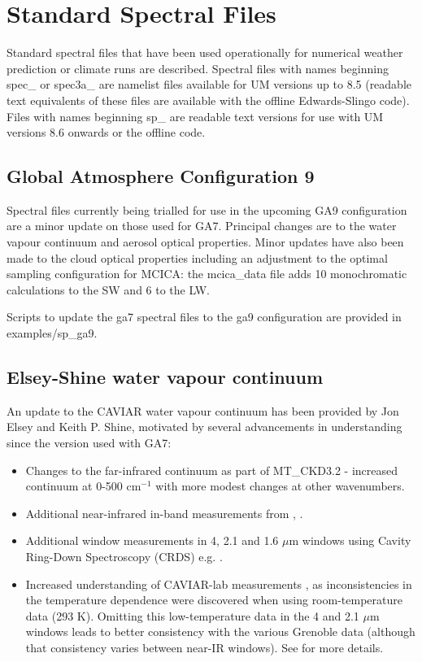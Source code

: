\section{Standard Spectral Files}

Standard spectral files that have been used operationally for numerical
weather prediction or climate runs are described. Spectral files with names
beginning spec\_ or spec3a\_ are namelist files available for UM versions
up to 8.5 (readable text equivalents of these files are available with the
offline Edwards-Slingo code). Files with names beginning sp\_ are readable
text versions for use with UM versions 8.6 onwards or the offline code.

\subsection{Global Atmosphere Configuration 9}

Spectral files currently being trialled for use in the upcoming GA9 configuration are a minor update on those used for GA7. Principal changes are to the water vapour continuum and aerosol optical properties. Minor updates have also been made to the cloud optical properties including an adjustment to the optimal sampling configuration for MCICA: the mcica\_data file adds 10 monochromatic calculations to the SW and 6 to the LW.

Scripts to update the ga7 spectral files to the ga9 configuration are provided in examples/sp\_ga9.

\subsection*{Elsey-Shine water vapour continuum}

An update to the CAVIAR water vapour continuum has been provided by Jon Elsey and Keith P. Shine, motivated by several advancements in understanding since the version used with GA7:
\begin{itemize}
\item Changes to the far-infrared continuum \citep{Mlawer19} as part of MT\_CKD3.2 - increased continuum at 0-500 cm$^{-1}$ with more modest changes at other wavenumbers.
\item Additional near-infrared in-band measurements from \cite{Ptashnik19}, \cite{Birk20}.
\item Additional window measurements in 4, 2.1 and 1.6 $\mu$m windows using Cavity Ring-Down Spectroscopy (CRDS) e.g. \cite{Mondelain14, Ventrillard15, Richard17}.
\item Increased understanding of CAVIAR-lab measurements \citep{Ptashnik11}, as inconsistencies in the temperature dependence were discovered when using room-temperature data (293 K). Omitting this low-temperature data in the 4 and 2.1 $\mu$m windows leads to better consistency with the various Grenoble data (although that consistency varies between near-IR windows). See \cite{Elsey20} for more details. 
\end{itemize}

